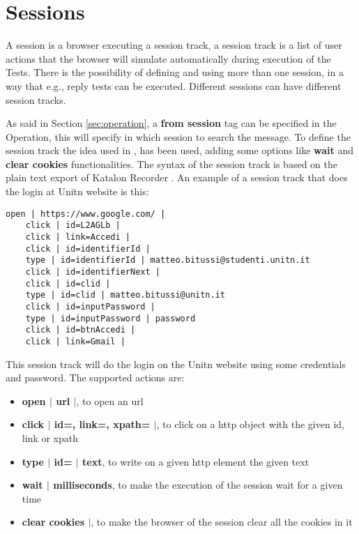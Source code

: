 \section{Sessions}
A session is a browser executing a \gls{session track}, a \gls{session track} is a list of user actions that the browser will simulate automatically during execution of the Tests. There is the possibility of defining and using more than one session, in a way that e.g., reply tests can be executed. Different sessions can have different session tracks.

As said in Section \ref{sec:operation}, a \textbf{from session} tag can be specified in the Operation, this will specify in which session to search the message. To define the \gls{session track} the idea used in \cite{claudio_grisenti,stefano_facchini}, has been used, adding some options like \textbf{wait} and \textbf{clear cookies} functionalities.
The syntax of the \gls{session track} is based on the plain text export of Katalon Recorder \cite{katalon_recorder_syntax}. 
An example of a \gls{session track} that does the login at Unitn website is this:

\begin{lstlisting}[caption=Session track Unitn login]
    open | https://www.google.com/ |
    click | id=L2AGLb |
    click | link=Accedi |
    click | id=identifierId |
    type | id=identifierId | matteo.bitussi@studenti.unitn.it
    click | id=identifierNext |
    click | id=clid |
    type | id=clid | matteo.bitussi@unitn.it
    click | id=inputPassword |
    type | id=inputPassword | password
    click | id=btnAccedi |
    click | link=Gmail |
\end{lstlisting}

This \gls{session track} will do the login on the Unitn website using some credentials and password. The supported actions are:
\begin{itemize}
    \item \textbf{open $|$ url $|$}, to open an url
    \item \textbf{click $|$ id=, link=, xpath= $|$}, to click on a http object with the given id, link or xpath
    \item \textbf{type $|$ id= $|$ text}, to write on a given http element the given text
    \item \textbf{wait $|$ milliseconds}, to make the execution of the session wait for a given time 
    \item \textbf{clear cookies $|$}, to make the browser of the session clear all the cookies in it
\end{itemize}



